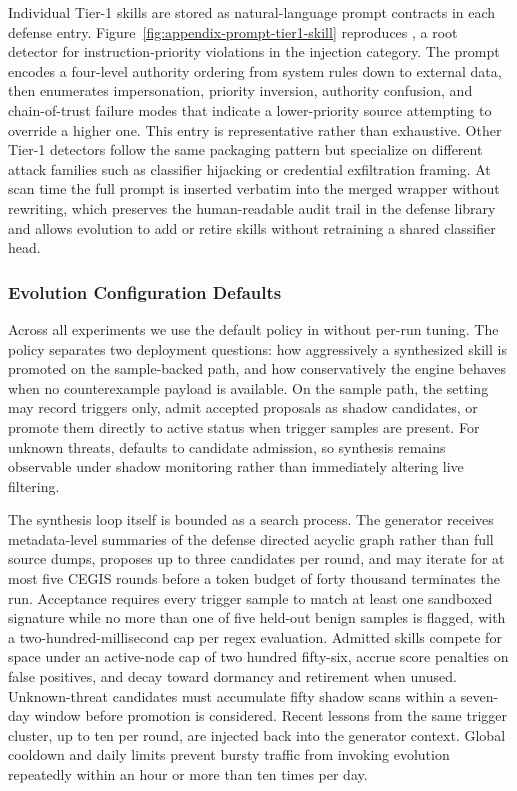 Individual Tier-1 skills are stored as natural-language prompt contracts
in each defense entry.
Figure~\ref{fig:appendix-prompt-tier1-skill} reproduces
, a root detector for
instruction-priority violations in the injection category.
The prompt encodes a four-level authority ordering from system rules down
to external data, then enumerates impersonation, priority inversion,
authority confusion, and chain-of-trust failure modes that indicate a
lower-priority source attempting to override a higher one.
This entry is representative rather than exhaustive.
Other Tier-1 detectors follow the same packaging pattern but specialize
on different attack families such as classifier hijacking or credential
exfiltration framing.
At scan time the full prompt is inserted verbatim into the merged wrapper
without rewriting, which preserves the human-readable audit trail in the
defense library and allows evolution to add or retire skills without
retraining a shared classifier head.

\subsubsection{Evolution Configuration Defaults}
\label{app:prompts-config-evolution}

Across all experiments we use the default \ttbf{[evolution]} policy in
 without per-run tuning.
The policy separates two deployment questions: how aggressively a
synthesized skill is promoted on the sample-backed path, and how
conservatively the engine behaves when no counterexample payload is
available.
On the sample path, the  setting may record triggers
only, admit accepted proposals as shadow candidates, or promote them
directly to active status when trigger samples are present.
For unknown threats,  defaults to
candidate admission, so synthesis remains observable under shadow
monitoring rather than immediately altering live filtering.

The synthesis loop itself is bounded as a search process.
The generator receives metadata-level summaries of the defense directed
acyclic graph rather than full source dumps, proposes up to three
candidates per round, and may iterate for at most five CEGIS rounds
before a token budget of forty thousand terminates the run.
Acceptance requires every trigger sample to match at least one sandboxed
signature while no more than one of five held-out benign samples is
flagged, with a two-hundred-millisecond cap per regex evaluation.
Admitted skills compete for space under an active-node cap of two hundred
fifty-six, accrue score penalties on false positives, and decay toward
dormancy and retirement when unused.
Unknown-threat candidates must accumulate fifty shadow scans within a
seven-day window before promotion is considered.
Recent lessons from the same trigger cluster, up to ten per round, are
injected back into the generator context.
Global cooldown and daily limits prevent bursty traffic from invoking
evolution repeatedly within an hour or more than ten times per day.

